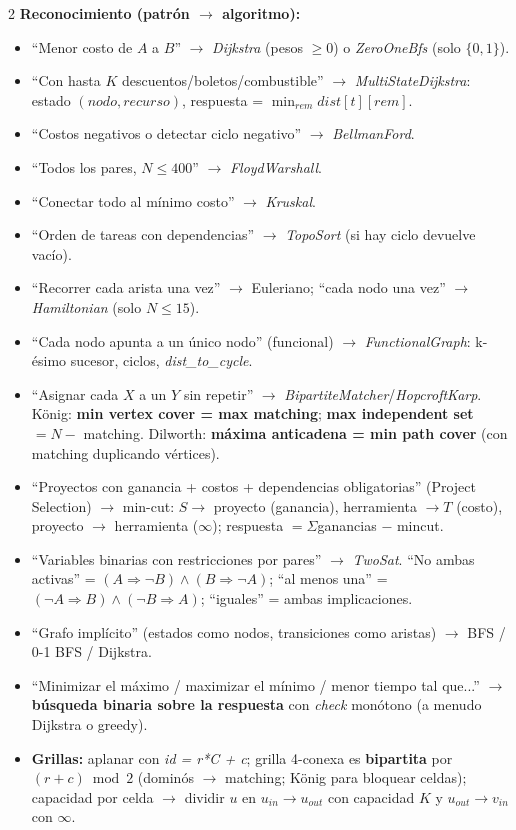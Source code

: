 \documentclass[10pt]{article}
\begin{document}
\begin{multicols}{2}
\textbf{Reconocimiento (patrón $\to$ algoritmo):}
\begin{itemize}\setlength{\itemsep}{1pt}
  \item ``Menor costo de $A$ a $B$'' $\to$ \textit{Dijkstra} (pesos $\ge 0$) o \textit{ZeroOneBfs} (solo $\{0,1\}$).
  \item ``Con hasta $K$ descuentos/boletos/combustible'' $\to$ \textit{MultiStateDijkstra}: estado $(nodo, recurso)$, respuesta = $\min_{rem} dist[t][rem]$.
  \item ``Costos negativos o detectar ciclo negativo'' $\to$ \textit{BellmanFord}.
  \item ``Todos los pares, $N \le 400$'' $\to$ \textit{FloydWarshall}.
  \item ``Conectar todo al mínimo costo'' $\to$ \textit{Kruskal}.
  \item ``Orden de tareas con dependencias'' $\to$ \textit{TopoSort} (si hay ciclo devuelve vacío).
  \item ``Recorrer cada arista una vez'' $\to$ Euleriano; ``cada nodo una vez'' $\to$ \textit{Hamiltonian} (solo $N \le 15$).
  \item ``Cada nodo apunta a un único nodo'' (funcional) $\to$ \textit{FunctionalGraph}: k-ésimo sucesor, ciclos, \textit{dist\_to\_cycle}.
  \item ``Asignar cada $X$ a un $Y$ sin repetir'' $\to$ \textit{BipartiteMatcher}/\textit{HopcroftKarp}. König: \textbf{min vertex cover = max matching}; \textbf{max independent set} $= N -$ matching. Dilworth: \textbf{máxima anticadena = min path cover} (con matching duplicando vértices).
  \item ``Proyectos con ganancia + costos + dependencias obligatorias'' (Project Selection) $\to$ min-cut: $S \to$ proyecto (ganancia), herramienta $\to T$ (costo), proyecto $\to$ herramienta ($\infty$); respuesta $= \Sigma$ganancias $-$ mincut.
  \item ``Variables binarias con restricciones por pares'' $\to$ \textit{TwoSat}. ``No ambas activas'' = $(A \Rightarrow \neg B) \wedge (B \Rightarrow \neg A)$; ``al menos una'' = $(\neg A \Rightarrow B) \wedge (\neg B \Rightarrow A)$; ``iguales'' = ambas implicaciones.
  \item ``Grafo implícito'' (estados como nodos, transiciones como aristas) $\to$ BFS / 0-1 BFS / Dijkstra.
  \item ``Minimizar el máximo / maximizar el mínimo / menor tiempo tal que...'' $\to$ \textbf{búsqueda binaria sobre la respuesta} con \textit{check} monótono (a menudo Dijkstra o greedy).
  \item \textbf{Grillas:} aplanar con \textit{id = r*C + c}; grilla 4-conexa es \textbf{bipartita} por $(r+c) \bmod 2$ (dominós $\to$ matching; König para bloquear celdas); capacidad por celda $\to$ dividir $u$ en $u_{in} \to u_{out}$ con capacidad $K$ y $u_{out} \to v_{in}$ con $\infty$.
\end{itemize}


\end{multicols}
\end{document}
